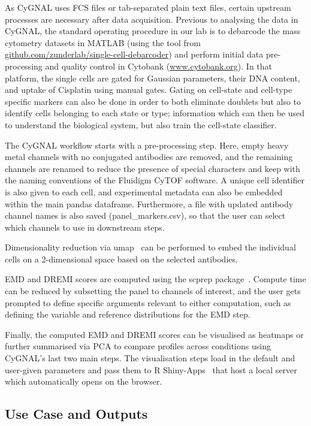 As CyGNAL uses FCS files or tab-separated plain text files, certain upstream processes are necessary after data acquisition. Previous to analysing the data in CyGNAL, the standard operating procedure in our lab is to debarcode the mass cytometry datasets in MATLAB (using the tool from \url{github.com/zunderlab/single-cell-debarcoder}) and perform initial data pre-processing and quality control in Cytobank (\url{www.cytobank.org}). In that platform, the single cells are gated for Gaussian parameters, their DNA content, and uptake of Cisplatin using manual gates. Gating on cell-state and cell-type specific markers can also be done in order to both eliminate doublets but also to identify cells belonging to each state or type; information which can then be used to understand the biological system, but also train the cell-state classifier.

The CyGNAL workflow starts with a pre-processing step. Here, empty heavy metal channels with no conjugated antibodies are removed, and the remaining channels are renamed to reduce the presence of special characters and keep with the naming conventions of the Fluidigm CyTOF software. A unique cell identifier is also given to each cell, and experimental metadata can also be embedded within the main pandas dataframe. Furthermore, a file with updated antibody channel names is also saved (panel\_markers.csv), so that the user can select which channels to use in downstream steps.

Dimensionality reduction via \acrfull{umap}~\cite{mcinnes_umap_2020} can be performed to embed the individual cells on a 2-dimensional space based on the selected antibodies.

EMD and DREMI scores are computed using the scprep package~\cite{noauthor_krishnaswamylabscprep_2021}. Compute time can be reduced by subsetting the panel to channels of interest, and the user gets prompted to define specific arguments relevant to either computation, such as defining the variable and reference distributions for the EMD step.

Finally, the computed EMD and DREMI scores can be visualised as heatmaps or further summarised via PCA to compare profiles across conditions using CyGNAL's last two main steps. The visualisation steps load in the default and user-given parameters and pass them to R Shiny-Apps~\cite{noauthor_rstudioshiny_2021} that host a local server which automatically opens on the browser.

\subsection{Use Case and Outputs}

